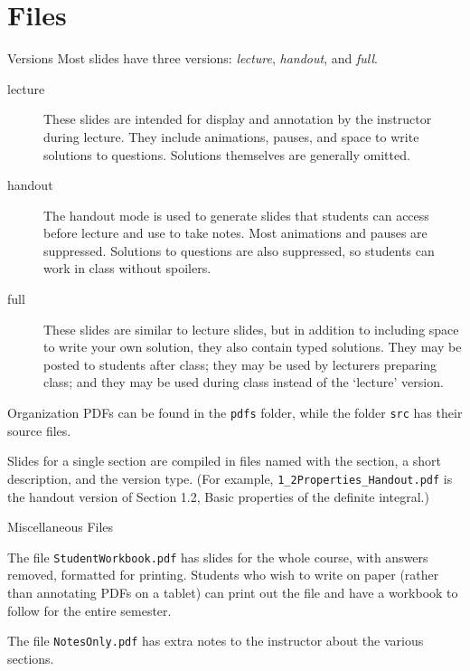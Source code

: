 \documentclass[10pt]{beamer}
\begin{document}
\section{Files}
\frame{\tableofcontents[currentsection]}
\begin{frame}{Versions} 
Most slides have three versions: \textit{lecture}, \textit{handout}, and \textit{full}.
\begin{description}
\item[lecture] These slides are intended for display and annotation by the instructor during lecture. They include animations, pauses, and space to write solutions to questions. Solutions themselves are generally omitted. 
\item[handout] The handout mode is used to generate slides that students can access before lecture and use to take notes. Most animations and pauses are suppressed. Solutions to questions are also suppressed, so students can work in class without spoilers.
\item[full] These slides are similar to lecture slides, but in addition to including space to write your own solution, they also contain typed solutions. They may be posted to students after class; they may be used by lecturers preparing class; and they may be used during class instead of the `lecture' version.
\end{description}
\end{frame}
\begin{frame}{Organization}
PDFs can be found in the \texttt{pdfs} folder, while the folder \texttt{src} has their source files.
\vfill

Slides for a single section are compiled in files named with the section, a short description, and the version type. (For example, \texttt{1\_2Properties\_Handout.pdf} is the handout version of Section 1.2, Basic properties of the definite integral.) 

\vfill
\end{frame}
\begin{frame}{Miscellaneous Files}

The file \texttt{StudentWorkbook.pdf} has slides for the whole course, with answers removed, formatted for printing. Students who wish to write on paper (rather than annotating PDFs on a tablet) can print out the file and have a workbook to follow for the entire semester.\vfill

The file \texttt{NotesOnly.pdf} has extra notes to the instructor about the various sections.
\end{frame}
\end{document}
